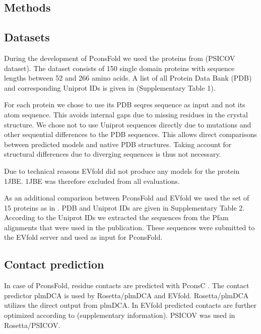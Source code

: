 \documentclass{bioinfo}
\begin{document}
\begin{methods}
\section{Methods}

\subsection{Datasets}
During the development of PconsFold we used the proteins from
\citeauthor{jones_PSICOV:_2012} \citeyear{jones_PSICOV:_2012} (PSICOV
dataset). The dataset consists of 150 single domain proteins with sequence
lengths between 52 and 266 amino acids. A list of all Protein Data
Bank (PDB) \cite[]{berman_protein_2000} and corresponding Uniprot
\cite[]{magrane_uniprot_2011} IDs is given in (Supplementary Table
1). 


For each protein we chose to use its PDB seqres sequence as input and
not its atom sequence. This avoids internal gaps due to missing
residues in the crystal structure. We chose not to use Uniprot
sequences directly due to mutations and other sequential differences
to the PDB sequences. This allows direct comparisons between predicted
models and native PDB structures. Taking account for structural
differences due to diverging sequences is thus not necessary. 

Due to technical reasons EVfold did not produce any models for the
protein 1JBE. 1JBE was therefore excluded from all evaluations.


As an additional comparison between PconsFold and EVfold we used the set
of 15 proteins as in \citeauthor{marks_protein_2011}
\citeyear{marks_protein_2011}. PDB and Uniprot IDs are given in
Supplementary Table 2. According to the Uniprot IDs we extracted the sequences from the
Pfam alignments that were used in the publication. These sequences were
submitted to the EVfold server and used as input for PconsFold.

\subsection{Contact prediction}
In case of PconsFold, residue contacts are predicted with PconsC
\cite[]{skwark_PconsC:_2013}. The contact predictor plmDCA
\cite[]{ekeberg_improved_2013} is used by Rosetta/plmDCA and
EVfold. Rosetta/plmDCA utilizes the direct output from plmDCA. In
EVfold predicted contacts are further optimized according to
\citeauthor{marks_protein_2011} \citeyear{marks_protein_2011}
(supplementary information). PSICOV was used in Rosetta/PSICOV. 



\end{methods}
\end{document}
